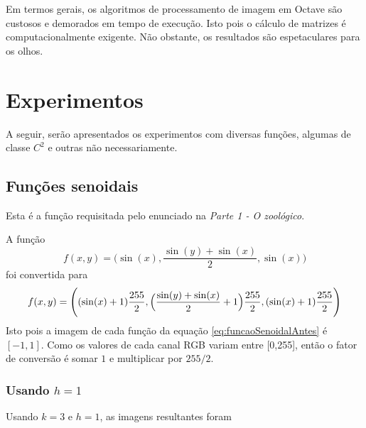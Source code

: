 \documentclass{article}
\begin{document}
Em termos gerais, os algoritmos de processamento de imagem em Octave são
custosos e demorados em tempo de execução. Isto pois o cálculo de matrizes
é computacionalmente exigente. Não obstante, os resultados são espetaculares
para os olhos. 

\section{Experimentos}

A seguir, serão apresentados os experimentos com diversas funções,
algumas de classe $C^2$ e outras não necessariamente.

\subsection{Funções senoidais} \label{subsec:funcoesSenoidais}

Esta é a função requisitada pelo enunciado na \textit{Parte 1 - O zoológico}.

A função
\begin{equation} \label{eq:funcaoSenoidalAntes}
  f(x,y) = \Biggl( \sin(x)
  , \dfrac{\sin(y) + \sin(x)}{2}
  , \sin(x) \Biggr)
\end{equation}
foi convertida para
\begin{equation}
  f(x,y) = \Biggl( (\sin(x) + 1) \dfrac{255}{2}
  , \Bigl( \frac{\sin(y) + \sin(x)}{2} + 1 \Bigr) \dfrac{255}{2}
  , (\sin(x) + 1) \dfrac{255}{2} \Biggr)
  \label{eq:funcaoSenoidalDepois}
\end{equation}
Isto pois a imagem de cada função da equação \ref{eq:funcaoSenoidalAntes}
é $[-1,1]$. Como os valores de cada canal RGB variam entre [0,255],
então o fator de conversão é somar $1$ e multiplicar por
$255/2$.

\subsubsection[Usando h=1]{Usando $h=1$} \label{subsubsec:senoidal-h=1}
Usando $k=3$ e $h=1$, as imagens resultantes foram
\end{document}
